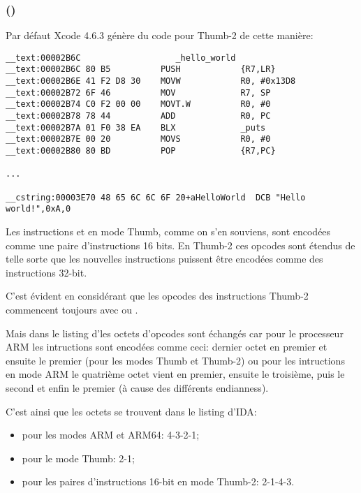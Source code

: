 \subsubsection{\OptimizingXcodeIV (\ThumbTwoMode)}

Par défaut Xcode 4.6.3 génère du code pour Thumb-2 de cette manière:

\begin{lstlisting}[caption=\OptimizingXcodeIV (\ThumbTwoMode),style=customasmARM]
__text:00002B6C                   _hello_world
__text:00002B6C 80 B5          PUSH            {R7,LR}
__text:00002B6E 41 F2 D8 30    MOVW            R0, #0x13D8
__text:00002B72 6F 46          MOV             R7, SP
__text:00002B74 C0 F2 00 00    MOVT.W          R0, #0
__text:00002B78 78 44          ADD             R0, PC
__text:00002B7A 01 F0 38 EA    BLX             _puts
__text:00002B7E 00 20          MOVS            R0, #0
__text:00002B80 80 BD          POP             {R7,PC}

...

__cstring:00003E70 48 65 6C 6C 6F 20+aHelloWorld  DCB "Hello world!",0xA,0
\end{lstlisting}


\myindex{\ThumbTwoMode}

Les instructions  et  en mode Thumb, comme on s'en souviens, sont
encodées comme une paire d'instructions 16 bits.
En Thumb-2 ces opcodes  sont étendus de telle sorte que les nouvelles
instructions puissent être encodées comme des instructions 32-bit.

C'est évident en considérant que les opcodes des instructions Thumb-2 commencent
toujours avec  ou .

Mais dans le listing d'\IDA les octets d'opcodes sont échangés car pour le processeur
ARM les intructions sont encodées comme ceci:
dernier octet en premier et ensuite le premier (pour les modes Thumb et Thumb-2)
ou pour les intructions en mode ARM le quatrième octet vient en premier, ensuite
le troisième, puis le second et enfin le premier (à cause des différents \gls{endianness}).

C'est ainsi que les octets se trouvent dans le listing d'IDA:
\begin{itemize}
\item pour les modes ARM et ARM64: 4-3-2-1;
\item pour le mode Thumb: 2-1;
\item pour les paires d'instructions 16-bit en mode Thumb-2: 2-1-4-3.
\end{itemize}

